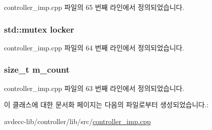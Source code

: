 controller\+\_\+imp.\+cpp 파일의 65 번째 라인에서 정의되었습니다.

\subsubsection[{\texorpdfstring{locker}{locker}}]{\setlength{\rightskip}{0pt plus 5cm}std\+::mutex locker\hspace{0.3cm}{\ttfamily [private]}}\hypertarget{classavdecc__lib_1_1end__stations_a2207f93fef130266b292686bf96ef8d3}{}\label{classavdecc__lib_1_1end__stations_a2207f93fef130266b292686bf96ef8d3}


controller\+\_\+imp.\+cpp 파일의 64 번째 라인에서 정의되었습니다.

\subsubsection[{\texorpdfstring{m\+\_\+count}{m_count}}]{\setlength{\rightskip}{0pt plus 5cm}size\+\_\+t m\+\_\+count\hspace{0.3cm}{\ttfamily [private]}}\hypertarget{classavdecc__lib_1_1end__stations_a7838b819effec21e6a176ce4303ef2e9}{}\label{classavdecc__lib_1_1end__stations_a7838b819effec21e6a176ce4303ef2e9}


controller\+\_\+imp.\+cpp 파일의 63 번째 라인에서 정의되었습니다.



이 클래스에 대한 문서화 페이지는 다음의 파일로부터 생성되었습니다.\+:\begin{DoxyCompactItemize}
\item 
avdecc-\/lib/controller/lib/src/\hyperlink{controller__imp_8cpp}{controller\+\_\+imp.\+cpp}\end{DoxyCompactItemize}
